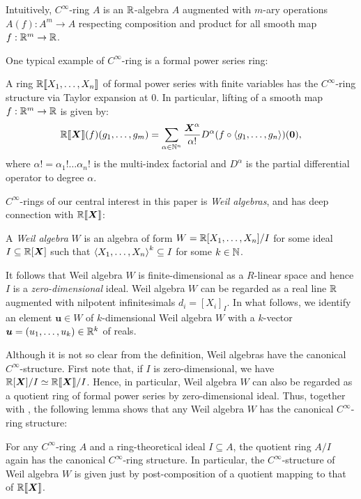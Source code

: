 \documentclass[%
  sigconf,authorversion,screen]{acmart}
\begin{document}
Intuitively, $C^\infty$-ring $A$ is an $\mathbb{R}$-algebra $A$ augmented with $m$-ary operations $A(f): A^m \to A$ respecting composition and product for all smooth map $f: \mathbb{R}^m \to \mathbb{R}$.

One typical example of $C^\infty$-ring is a formal power series ring:

\begin{theorem}[Lawvere]\label{thm:series-is-smooth}
  A ring $\mathbb{R}\llbracket X_1, \dots, X_n\rrbracket$ of formal power series with finite variables has the $C^\infty$-ring structure via Taylor expansion at $0$.
  In particular, lifting of a smooth map $f: \mathbb{R}^m \to \mathbb{R}$ is given by:
  \[
    \mathbb{R}\llbracket\boldsymbol{X}\rrbracket(f)(g_1, \dots, g_m) = \sum_{\alpha \in \mathbb{N}^n} \frac{\boldsymbol{X}^\alpha}{\alpha!} D^\alpha(f \circ \braket{g_1, \dots, g_n})(\boldsymbol{0}),
  \]
  where $\alpha! = \alpha_1 ! \dots \alpha_n !$ is the multi-index factorial and $D^\alpha$ is the partial differential operator to degree $\alpha$.
\end{theorem}

$C^\infty$-rings of our central interest in this paper is \emph{Weil algebras}, and has deep connection with $\mathbb{R}\llbracket\boldsymbol{X}\rrbracket$:

\begin{definition}
  A \emph{Weil algebra} $W$ is an algebra of form $W = \mathbb{R}[X_1, \dots, X_n]/I$ for some ideal $I \subseteq \mathbb{R}[\boldsymbol{X}]$ such that $\braket{X_1, \dots, X_n}^k \subseteq I$ for some $k \in \mathbb{N}$.
\end{definition}
It follows that Weil algebra $W$ is finite-dimensional as a $R$-linear space and hence $I$ is a \emph{zero-dimensional} ideal.
Weil algebra $W$ can be regarded as a real line $\mathbb{R}$ augmented with nilpotent infinitesimals $d_i = {[X_i]}_I$.
In what follows, we identify an element $\boldsymbol{u} \in W$ of $k$-dimensional Weil algebra $W$ with a $k$-vector $\boldsymbol{u} = (u_1, \dots, u_k) \in \mathbb{R}^k$ of reals.

Although it is not so clear from the definition, Weil algebras have the canonical $C^\infty$-structure.
First note that, if $I$ is zero-dimensional, we have $\mathbb{R}[\boldsymbol{X}]/I \simeq \mathbb{R}\llbracket \boldsymbol{X} \rrbracket /I$.
Hence, in particular, Weil algebra $W$ can also be regarded as a quotient ring of formal power series by zero-dimensional ideal.
Thus, together with , the following lemma shows that any Weil algebra $W$ has the canonical $C^\infty$-ring structure:

\begin{lemma}
  For any $C^\infty$-ring $A$ and a ring-theoretical ideal $I \subseteq A$, the quotient ring $A/I$ again has the canonical $C^\infty$-ring structure.
  In particular, the $C^\infty$-structure of Weil algebra $W$ is given just by post-composition of a quotient mapping to that of $\mathbb{R}\llbracket\boldsymbol{X}\rrbracket$.
\end{lemma}
\end{document}
